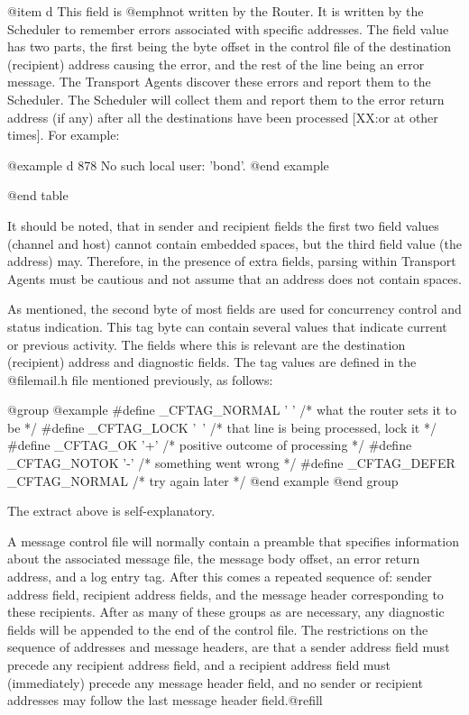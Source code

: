 {{@item d
This field is @emph{not} written by the Router.
It is written by the Scheduler to remember errors associated
with specific addresses.
The field  value has two parts, the first being the byte offset
in the control file of the destination (recipient) address causing
the error, and the rest of the line being an error message.
The Transport Agents discover these errors and report them to the Scheduler.
The Scheduler will collect them and report them to the error return address
(if any) after all the destinations have been processed [XX:or at other times].
For example:

@example
d 878 No such local user: 'bond'.
@end example

@end table

It should be noted, that in sender and recipient fields the first two
field values (channel and host) cannot contain embedded spaces, but the
third field value (the address) may.
Therefore, in the presence of extra fields, parsing within Transport Agents
must be cautious and not assume that an address does not contain spaces.

As mentioned, the second byte of most fields are used for concurrency control
and status indication.
This tag byte can contain several values that indicate current or previous
activity.
The fields where this is relevant are the destination (recipient) address
and diagnostic fields.
The tag values are defined in the @file{mail.h} file mentioned previously,
as follows:

@group
@example
#define _CFTAG_NORMAL ' ' /* what the router sets it to be */
#define _CFTAG_LOCK   '~' /* that line is being processed, lock it */
#define _CFTAG_OK     '+' /* positive outcome of processing */
#define _CFTAG_NOTOK  '-' /* something went wrong */
#define _CFTAG_DEFER  _CFTAG_NORMAL /* try again later */
@end example
@end group

The extract above is self-explanatory.

A message control file will normally contain a preamble that specifies
information about the associated message file, the message body offset, an
error return address, and a log entry tag.  After this comes a repeated
sequence of: sender address field, recipient address fields, and the message
header corresponding to these recipients.  After as many of these groups as
are necessary, any diagnostic fields will be appended to the end of the
control file.  The restrictions on the sequence of addresses and message
headers, are that a sender address field must precede any recipient address
field, and a recipient address field must (immediately) precede any message
header field, and no sender or recipient addresses may follow the last
message header field.@refill

}}
